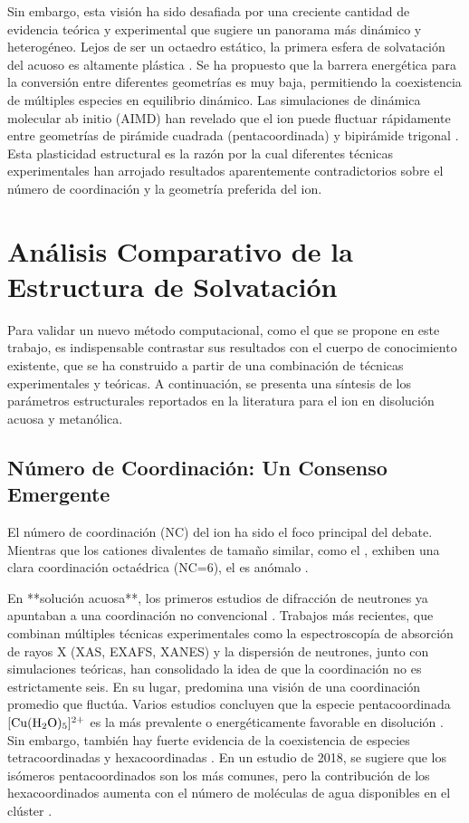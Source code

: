 Sin embargo, esta visión ha sido desafiada por una creciente cantidad de evidencia teórica y experimental que sugiere un panorama más dinámico y heterogéneo. Lejos de ser un octaedro estático, la primera esfera de solvatación del  acuoso es altamente plástica \cite{Wa-2018-02}. Se ha propuesto que la barrera energética para la conversión entre diferentes geometrías es muy baja, permitiendo la coexistencia de múltiples especies en equilibrio dinámico. Las simulaciones de dinámica molecular ab initio (AIMD) han revelado que el ion puede fluctuar rápidamente entre geometrías de pirámide cuadrada (pentacoordinada) y bipirámide trigonal \cite{Wa-2001-01, Wa-2010-03}. Esta plasticidad estructural es la razón por la cual diferentes técnicas experimentales han arrojado resultados aparentemente contradictorios sobre el número de coordinación y la geometría preferida del ion.

\section{Análisis Comparativo de la Estructura de Solvatación}

Para validar un nuevo método computacional, como el que se propone en este trabajo, es indispensable contrastar sus resultados con el cuerpo de conocimiento existente, que se ha construido a partir de una combinación de técnicas experimentales y teóricas. A continuación, se presenta una síntesis de los parámetros estructurales reportados en la literatura para el ion  en disolución acuosa y metanólica.

\subsection{Número de Coordinación: Un Consenso Emergente}

El número de coordinación (NC) del ion  ha sido el foco principal del debate. Mientras que los cationes divalentes de tamaño similar, como el , exhiben una clara coordinación octaédrica (NC=6), el  es anómalo \cite{Wa-1982-01, Wa-2001-01}.

En **solución acuosa**, los primeros estudios de difracción de neutrones ya apuntaban a una coordinación no convencional \cite{Wa-1982-01}. Trabajos más recientes, que combinan múltiples técnicas experimentales como la espectroscopía de absorción de rayos X (XAS, EXAFS, XANES) y la dispersión de neutrones, junto con simulaciones teóricas, han consolidado la idea de que la coordinación no es estrictamente seis. En su lugar, predomina una visión de una coordinación promedio que fluctúa. Varios estudios concluyen que la especie pentacoordinada $[\ce{Cu(H2O)5}]^{2+}$ es la más prevalente o energéticamente favorable en disolución \cite{Wa-2002-01, Wa-2005-01, Wa-2005-02, Wa-2008-01, Wa-2010-03, Wa-2012-01, Wa-2024-01}. Sin embargo, también hay fuerte evidencia de la coexistencia de especies tetracoordinadas y hexacoordinadas \cite{Wa-2009-01, Wa-2017-01, Wa-2023-01}. En un estudio de 2018, se sugiere que los isómeros pentacoordinados son los más comunes, pero la contribución de los hexacoordinados aumenta con el número de moléculas de agua disponibles en el clúster \cite{Wa-2018-01}.

